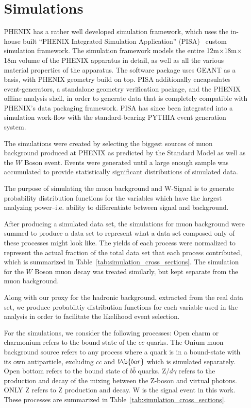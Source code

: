 \clearpage
\section{Simulations}
\label{sec:simulations}

PHENIX has a rather well developed simulation framework, which uses the in-house
built ``PHENIX Integrated Simulation Application'' (PISA)~\cite{Maguire1997}
custom simulation framework. The simulation framework models the entire
12m$\times$18m$\times$18m volume of the PHENIX apparatus in detail, as well as
all the various material properties of the apparatus. The software package uses
GEANT as a basis, with PHENIX geometry build on top. PISA additionally
encapsulates event-generators, a standalone geometry verification package, and
the PHENIX offline analysis shell, in order to generate data that is completely
compatible with PHENIX's data packaging framework. PISA has since been
integrated into a simulation work-flow with the standard-bearing PYTHIA event
generation system.

The simulations were created by selecting the biggest sources of muon background
produced at PHENIX as predicted by the Standard Model as well as the $W$ Boson
event. Events were generated until a large enough sample was accumulated to
provide statistically significant distributions of simulated data.

The purpose of simulating the muon background and W-Signal is to generate
probability distribution functions for the variables which have the largest
analyzing power--i.e. ability to differentiate between signal and background.

After producing a simulated data set, the simulations for muon background were
summed to produce a data set to represent what a data set composed only of these
processes might look like. The yields of each process were normalized to
represent the actual fraction of the total data set that each process
contributed, which is summarized in Table~\ref{tab:simulation_cross_sections}.
The simulation for the $W$ Boson muon decay was treated similarly, but kept
separate from the muon background.

Along with our proxy for the hadronic background, extracted from the real data
set, we produce probabiltiy distribution functions for each variable used in the
analysis in order to facilitate the likelihood event selection.

For the simulations, we consider the following processes: Open charm or
charmonium refers to the bound state of the $c\bar{c}$ quarks. The Onium muon
background source refers to any process where a quark is in a bound-state with
its own antiparticle, excluding $c\bar{c}$ and $b\b{bar}$ which is simulated
separately. Open bottom refers to the bound state of $b\bar{b}$ quarks.
Z/$d\gamma$ refers to the production and decay of the mixing between the Z-boson
and virtual photons. ONLY Z refers to Z production and decay.  W is the signal
event in this work.  These processes are summarized in
Table~\ref{tab:simulation_cross_sections}.  

